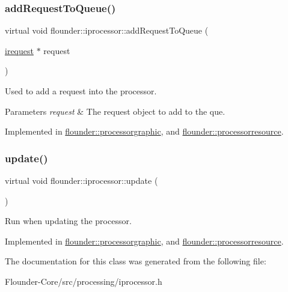 \subsubsection{\texorpdfstring{add\+Request\+To\+Queue()}{addRequestToQueue()}}
{\footnotesize\ttfamily virtual void flounder\+::iprocessor\+::add\+Request\+To\+Queue (\begin{DoxyParamCaption}\item[{\hyperlink{classflounder_1_1irequest}{irequest} $\ast$}]{request }\end{DoxyParamCaption})\hspace{0.3cm}{\ttfamily [pure virtual]}}



Used to add a request into the processor. 


\begin{DoxyParams}{Parameters}
{\em request} & The request object to add to the que. \\
\hline
\end{DoxyParams}


Implemented in \hyperlink{classflounder_1_1processorgraphic_a28c8b84c3f8066ff9b3cf01a18e8c18a}{flounder\+::processorgraphic}, and \hyperlink{classflounder_1_1processorresource_a4ae0dda615f98e93faadda22e74d61e2}{flounder\+::processorresource}.

\mbox{\label{classflounder_1_1iprocessor_ad2edfece3465ec3dbe0a5feac26bdbc3}} 
\subsubsection{\texorpdfstring{update()}{update()}}
{\footnotesize\ttfamily virtual void flounder\+::iprocessor\+::update (\begin{DoxyParamCaption}{ }\end{DoxyParamCaption})\hspace{0.3cm}{\ttfamily [pure virtual]}}



Run when updating the processor. 



Implemented in \hyperlink{classflounder_1_1processorgraphic_a09711d00647681305dfd8067310ec257}{flounder\+::processorgraphic}, and \hyperlink{classflounder_1_1processorresource_afaeb27a9673c1f9b4366b537b7c0d377}{flounder\+::processorresource}.



The documentation for this class was generated from the following file\+:\begin{DoxyCompactItemize}
\item 
Flounder-\/\+Core/src/processing/iprocessor.\+h\end{DoxyCompactItemize}
